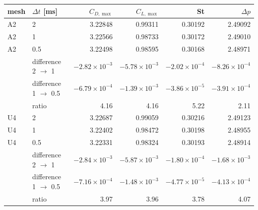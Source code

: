 \begin{tabular}{llrrrr}
\toprule
mesh & $\Delta t$ [ms] & $C_{D,\max}$ & $C_{L,\max}$ & St & $\Delta p$ \\
\midrule
A2 & 2 & 3.22848 & 0.99311 & 0.30192 & 2.49092 \\
A2 & 1 & 3.22566 & 0.98733 & 0.30172 & 2.49010 \\
A2 & 0.5 & 3.22498 & 0.98595 & 0.30168 & 2.48971 \\
 & difference 2 $\to$ 1 & $-2.82\times10^{-3}$ & $-5.78\times10^{-3}$ & $-2.02\times10^{-4}$ & $-8.26\times10^{-4}$ \\
 & difference 1 $\to$ 0.5 & $-6.79\times10^{-4}$ & $-1.39\times10^{-3}$ & $-3.86\times10^{-5}$ & $-3.91\times10^{-4}$ \\
 & ratio & 4.16 & 4.16 & 5.22 & 2.11 \\
\midrule
U4 & 2 & 3.22687 & 0.99059 & 0.30216 & 2.49123 \\
U4 & 1 & 3.22402 & 0.98472 & 0.30198 & 2.48955 \\
U4 & 0.5 & 3.22331 & 0.98324 & 0.30193 & 2.48914 \\
 & difference 2 $\to$ 1 & $-2.84\times10^{-3}$ & $-5.87\times10^{-3}$ & $-1.80\times10^{-4}$ & $-1.68\times10^{-3}$ \\
 & difference 1 $\to$ 0.5 & $-7.16\times10^{-4}$ & $-1.48\times10^{-3}$ & $-4.77\times10^{-5}$ & $-4.13\times10^{-4}$ \\
 & ratio & 3.97 & 3.96 & 3.78 & 4.07 \\
\bottomrule
\end{tabular}

